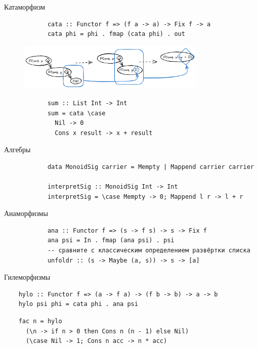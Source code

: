     \begin{frame}[fragile]{Катаморфизм}
        \pause
        \begin{verbatim}
            cata :: Functor f => (f a -> a) -> Fix f -> a
            cata phi = phi . fmap (cata phi) . out
        \end{verbatim}
        \begin{figure}[h]
            \centering
            \includegraphics[width=0.8\textwidth]{figs/cataStep.excalidraw}
        \end{figure}
        \begin{verbatim}
            sum :: List Int -> Int
            sum = cata \case
              Nil -> 0
              Cons x result -> x + result
        \end{verbatim}
    \end{frame}

    \begin{frame}[fragile]{Алгебры}
        \pause
        \begin{verbatim}
            data MonoidSig carrier = Mempty | Mappend carrier carrier

            interpretSig :: MonoidSig Int -> Int
            interpretSig = \case Mempty -> 0; Mappend l r -> l + r
        \end{verbatim}
    \end{frame}

    \begin{frame}[fragile]{Анаморфизмы}
        \pause
        \begin{verbatim}
            ana :: Functor f => (s -> f s) -> s -> Fix f
            ana psi = In . fmap (ana psi) . psi
            -- сравните с классическим определением развёртки списка
            unfoldr :: (s -> Maybe (a, s)) -> s -> [a]
        \end{verbatim}
    \end{frame}

    \begin{frame}[fragile]{Гилеморфизмы}
        \pause
        \begin{verbatim}
    hylo :: Functor f => (a -> f a) -> (f b -> b) -> a -> b
    hylo psi phi = cata phi . ana psi
        \end{verbatim}
        \pause\vspace{1em}
        \begin{verbatim}
    fac n = hylo
      (\n -> if n > 0 then Cons n (n - 1) else Nil)
      (\case Nil -> 1; Cons n acc -> n * acc)
        \end{verbatim}
    \end{frame}

